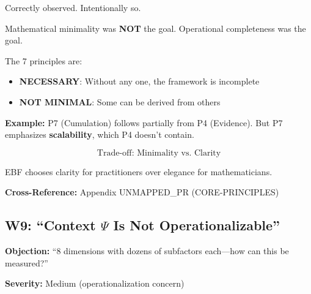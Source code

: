 \begin{axiom}
Correctly observed. Intentionally so.

Mathematical minimality was \textbf{NOT} the goal.
Operational completeness was the goal.

The 7 principles are:
\begin{itemize}[nosep]
    \item \textbf{NECESSARY}: Without any one, the framework is incomplete
    \item \textbf{NOT MINIMAL}: Some can be derived from others
\end{itemize}

\textbf{Example:} P7 (Cumulation) follows partially from P4 (Evidence).
But P7 emphasizes \textbf{scalability}, which P4 doesn't contain.

\begin{equation}
\text{Trade-off: Minimality vs. Clarity}
\end{equation}

EBF chooses clarity for practitioners over elegance for mathematicians.
\end{axiom}

\textbf{Cross-Reference:} Appendix UNMAPPED_PR (CORE-PRINCIPLES)

\subsection{W9: ``Context $\Psi$ Is Not Operationalizable''}
\label{sec:da-w9}

\begin{tcolorbox}[colback=gray!5!white, colframe=gray!75!black]
\textbf{Objection:} ``8 dimensions with dozens of subfactors each---how can this be measured?''

\textbf{Severity:} Medium (operationalization concern)
\end{tcolorbox}

